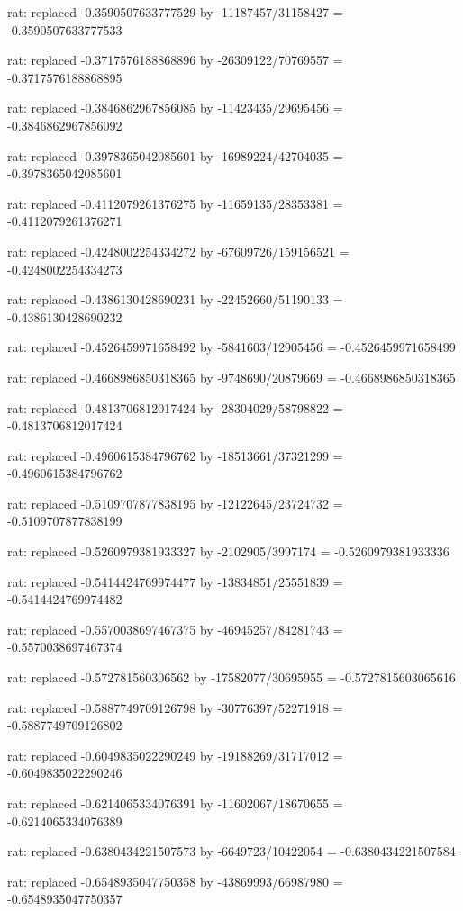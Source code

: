 \documentclass[a4paper,10pt]{article}
\begin{document}
\begin{eulernotebook}
\begin{eulercomment}
\begin{eulercomment}
\begin{eulercomment}
\begin{eulercomment}
\begin{eulercomment}
\begin{eulercomment}
\begin{eulercomment}
\begin{eulercomment}
\begin{eulercomment}
\begin{eulercomment}
\begin{eulercomment}
\begin{eulercomment}
\begin{eulercomment}
\begin{eulercomment}
\begin{eulercomment}
\begin{eulercomment}
\begin{euleroutput}
  rat: replaced -0.3590507633777529 by -11187457/31158427 = -0.3590507633777533
  
  rat: replaced -0.3717576188868896 by -26309122/70769557 = -0.3717576188868895
  
  rat: replaced -0.3846862967856085 by -11423435/29695456 = -0.3846862967856092
  
  rat: replaced -0.3978365042085601 by -16989224/42704035 = -0.3978365042085601
  
  rat: replaced -0.4112079261376275 by -11659135/28353381 = -0.4112079261376271
  
  rat: replaced -0.4248002254334272 by -67609726/159156521 = -0.4248002254334273
  
  rat: replaced -0.4386130428690231 by -22452660/51190133 = -0.4386130428690232
  
  rat: replaced -0.4526459971658492 by -5841603/12905456 = -0.4526459971658499
  
  rat: replaced -0.4668986850318365 by -9748690/20879669 = -0.4668986850318365
  
  rat: replaced -0.4813706812017424 by -28304029/58798822 = -0.4813706812017424
  
  rat: replaced -0.4960615384796762 by -18513661/37321299 = -0.4960615384796762
  
  rat: replaced -0.5109707877838195 by -12122645/23724732 = -0.5109707877838199
  
  rat: replaced -0.5260979381933327 by -2102905/3997174 = -0.5260979381933336
  
  rat: replaced -0.5414424769974477 by -13834851/25551839 = -0.5414424769974482
  
  rat: replaced -0.5570038697467375 by -46945257/84281743 = -0.5570038697467374
  
  rat: replaced -0.572781560306562 by -17582077/30695955 = -0.5727815603065616
  
  rat: replaced -0.5887749709126798 by -30776397/52271918 = -0.5887749709126802
  
  rat: replaced -0.6049835022290249 by -19188269/31717012 = -0.6049835022290246
  
  rat: replaced -0.6214065334076391 by -11602067/18670655 = -0.6214065334076389
  
  rat: replaced -0.6380434221507573 by -6649723/10422054 = -0.6380434221507584
  
  rat: replaced -0.6548935047750358 by -43869993/66987980 = -0.6548935047750357
  

\end{euleroutput}
\end{eulercomment}
\end{eulercomment}
\end{eulercomment}
\end{eulercomment}
\end{eulercomment}
\end{eulercomment}
\end{eulercomment}
\end{eulercomment}
\end{eulercomment}
\end{eulercomment}
\end{eulercomment}
\end{eulercomment}
\end{eulercomment}
\end{eulercomment}
\end{eulercomment}
\end{eulercomment}
\end{eulernotebook}
\end{document}
